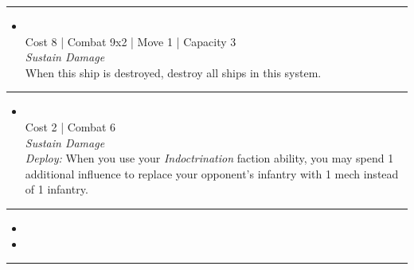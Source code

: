 \begin{multicols}{2}
\vspace{-10pt}\rule{\hsize}{0.4pt}\vspace{5pt}


\begin{itemize}
\item {}\\
Cost 8 | Combat 9x2 | Move 1 | Capacity 3 \\
\emph{Sustain Damage}\\
When this ship is destroyed, destroy all ships in this system.
\end{itemize}

\vspace{-10pt}\rule{\hsize}{0.4pt}\vspace{5pt}


\begin{itemize}
\item {}\\
Cost 2 | Combat 6 \\
\emph{Sustain Damage}\\
\emph{Deploy:} When you use your \emph{Indoctrination} faction ability, you may spend 1 additional influence to replace your opponent's infantry with 1 mech instead of 1 infantry. 
\end{itemize}

\vspace{-10pt}\rule{\hsize}{0.4pt}\vspace{5pt}

\nounits

\columnbreak
{}

\begin{itemize}
\item \spinner
\item \impulseCore
\end{itemize}

\vspace{-10pt}\rule{\hsize}{0.4pt}\vspace{5pt}



\end{multicols}
